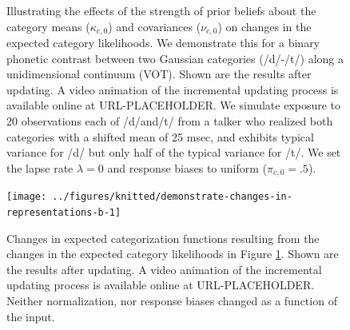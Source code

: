 \documentclass[
  11pt,
  man,floatsintext]{apa6}
\begin{document}
\begin{figure}

{\centering {}

}

\caption[Illustrating the effects of the strength of prior beliefs about the category means (\(\kappa_{c,0}\)) and covariances (\(\nu_{c,0}\)) on changes in the expected category likelihoods. We demonstrate this for a binary phonetic contrast between two Gaussian categories (/d/-/t/) along a unidimensional continuum (VOT). Shown are the results after updating. A video animation of the incremental updating process is available online at URL-PLACEHOLDER. We simulate exposure to 20 observations each of /d/and/t/ from a talker who realized both categories with a shifted mean of 25 msec, and exhibits typical variance for /d/ but only half of the typical variance for /t/. We set the lapse rate \(\lambda = 0\) and response biases to uniform (\(\pi_{c,0}=.5\)).]{Illustrating the effects of the strength of prior beliefs about the category means (\(\kappa_{c,0}\)) and covariances (\(\nu_{c,0}\)) on changes in the expected category likelihoods. We demonstrate this for a binary phonetic contrast between two Gaussian categories (/d/-/t/) along a unidimensional continuum (VOT). Shown are the results after updating. A video animation of the incremental updating process is available online at URL-PLACEHOLDER. We simulate exposure to 20 observations each of /d/and/t/ from a talker who realized both categories with a shifted mean of 25 msec, and exhibits typical variance for /d/ but only half of the typical variance for /t/. We set the lapse rate \(\lambda = 0\) and response biases to uniform (\(\pi_{c,0}=.5\)).}\label{fig:demonstrate-changes-in-representations}
\end{figure}



\begin{figure}

{\centering \texttt{[image: ../figures/knitted/demonstrate-changes-in-representations-b-1]} 

}

\caption{Changes in expected categorization functions resulting from the changes in the expected category likelihoods in Figure \ref{fig:demonstrate-changes-in-representations}. Shown are the results after updating. A video animation of the incremental updating process is available online at URL-PLACEHOLDER. Neither normalization, nor response biases changed as a function of the input.}\label{fig:demonstrate-changes-in-representations-b}
\end{figure}
\end{document}
